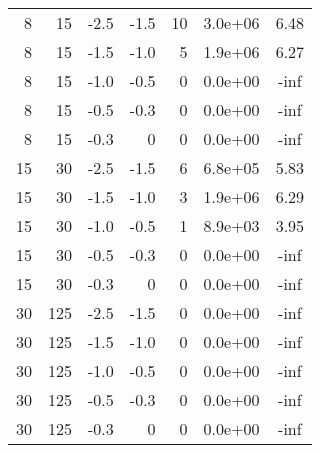 \documentclass[12pt, a4paper]{article}
\begin{document}
{\begin{table}[ht!]
\begin{tabular}{rrrrrrc}
        \hline
        8      & 15     & -2.5   & -1.5   & 10     & 3.0e+06 & 6.48       \\
        8      & 15     & -1.5   & -1.0   & 5      & 1.9e+06 & 6.27       \\
        8      & 15     & -1.0   & -0.5   & 0      & 0.0e+00 & -inf       \\
        8      & 15     & -0.5   & -0.3   & 0      & 0.0e+00 & -inf       \\
        8      & 15     & -0.3   & 0      & 0      & 0.0e+00 & -inf       \\
        \hline
        15     & 30     & -2.5   & -1.5   & 6      & 6.8e+05 & 5.83       \\
        15     & 30     & -1.5   & -1.0   & 3      & 1.9e+06 & 6.29       \\
        15     & 30     & -1.0   & -0.5   & 1      & 8.9e+03 & 3.95       \\
        15     & 30     & -0.5   & -0.3   & 0      & 0.0e+00 & -inf       \\
        15     & 30     & -0.3   & 0      & 0      & 0.0e+00 & -inf       \\
        \hline
        30     & 125    & -2.5   & -1.5   & 0      & 0.0e+00 & -inf       \\
        30     & 125    & -1.5   & -1.0   & 0      & 0.0e+00 & -inf       \\
        30     & 125    & -1.0   & -0.5   & 0      & 0.0e+00 & -inf       \\
        30     & 125    & -0.5   & -0.3   & 0      & 0.0e+00 & -inf       \\
        30     & 125    & -0.3   & 0      & 0      & 0.0e+00 & -inf       \\
        \hline
    \end{tabular}
\end{table}
\clearpage
\restoregeometry
}
\clearpage
\end{document}
